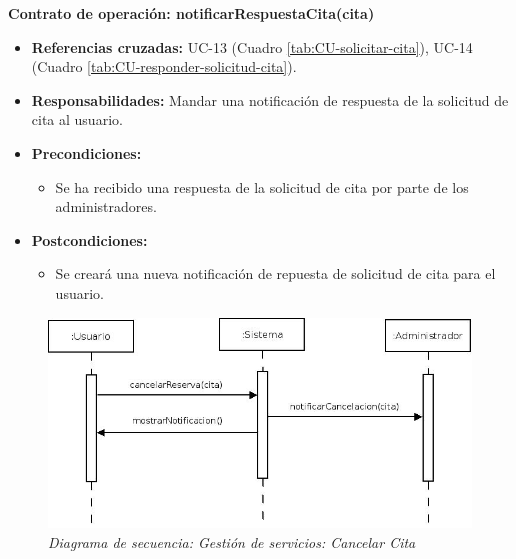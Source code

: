 \textbf{Contrato de operación: notificarRespuestaCita(cita)}
\begin{itemize}
\item \textbf{Referencias cruzadas:} UC-13 (Cuadro \ref{tab:CU-solicitar-cita}), UC-14 (Cuadro \ref{tab:CU-responder-solicitud-cita}).
\item \textbf{Responsabilidades:} Mandar una notificación de respuesta de la solicitud de cita al usuario.
\item \textbf{Precondiciones:} 
 \begin{itemize}
\item Se ha recibido una respuesta de la solicitud de cita por parte de los administradores.
\end {itemize}
\item \textbf{Postcondiciones:} 
 \begin{itemize}
\item Se creará una nueva notificación de repuesta de solicitud de cita para el usuario.
\end {itemize}
\end {itemize}


\vspace{10mm}

\begin{figure}[H]
\centering
  \includegraphics[scale=.50]{img/secuencias/gestion-servicios-cancelar-cita-por-parte-de-usuario.jpeg}
  \caption{\textit{Diagrama de secuencia: Gestión de servicios: Cancelar Cita}}
  \label{fig:secuencia-gestion-servicios-cancelar-cita-por-parte-de-usuario}
\end{figure}


